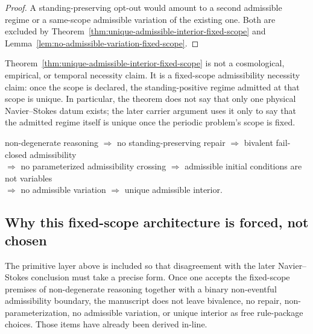 \begin{proof}
A standing-preserving opt-out would amount to a second admissible regime or a same-scope admissible variation of the existing one. Both are excluded by Theorem~\ref{thm:unique-admissible-interior-fixed-scope} and Lemma~\ref{lem:no-admissible-variation-fixed-scope}.
\end{proof}

\begin{remark}\label{rem:interpretive-boundary-fixed-scope}
Theorem~\ref{thm:unique-admissible-interior-fixed-scope} is not a cosmological, empirical, or temporal necessity claim. It is a fixed-scope admissibility necessity claim: once the scope is declared, the standing-positive regime admitted at that scope is unique. In particular, the theorem does not say that only one physical Navier--Stokes datum exists; the later carrier argument uses it only to say that the admitted regime itself is unique once the periodic problem's scope is fixed.
\end{remark}

\begin{tcolorbox}[title={Primitive necessity chain at fixed scope}, colback=blue!2!white, colframe=blue!55!black]
\begin{center}
\small
non-degenerate reasoning $\Longrightarrow$ no standing-preserving repair $\Longrightarrow$ bivalent fail-closed admissibility\\[0.35em]
$\Longrightarrow$ no parameterized admissibility crossing $\Longrightarrow$ admissible initial conditions are not variables\\[0.35em]
$\Longrightarrow$ no admissible variation $\Longrightarrow$ unique admissible interior.
\end{center}
\end{tcolorbox}

\subsection*{Why this fixed-scope architecture is forced, not chosen}
The primitive layer above is included so that disagreement with the later Navier--Stokes conclusion must take a precise form. Once one accepts the fixed-scope premises of non-degenerate reasoning together with a binary non-eventful admissibility boundary, the manuscript does not leave bivalence, no repair, non-parameterization, no admissible variation, or unique interior as free rule-package choices. Those items have already been derived in-line.

